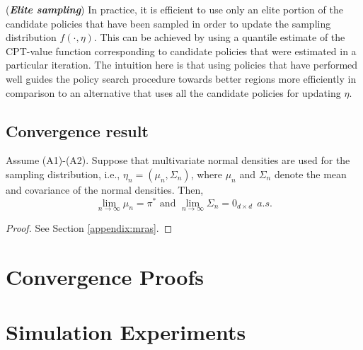 \documentclass[11pt,letterpaper,english]{article}
\begin{document}
\begin{remark}(\textbf{\textit{Elite sampling}})
In practice, it is efficient to use only an elite portion of the candidate policies that have been sampled in order to update the sampling distribution $f(\cdot,\eta)$. This can be achieved by using a quantile estimate of the CPT-value function corresponding to candidate policies that were estimated in a particular iteration. The intuition here is that using policies that have performed well guides the policy search procedure towards better regions more efficiently in comparison to an alternative that uses all the candidate policies for updating $\eta$.
\end{remark}

\subsection{Convergence result}
\begin{theorem}\label{thm:mras}
Assume (A1)-(A2). Suppose that multivariate normal densities are used for the sampling distribution, i.e., $\eta_n = (\mu_n, \Sigma_n)$, where $\mu_n$ and $\Sigma_n$ denote the mean and covariance of the normal densities.
Then, 
\begin{equation}\label{eqn:smain}
\lim_{n\rightarrow \infty}\mu_n=\pi^* \text{ and } \lim_{n\rightarrow \infty}\Sigma_n=0_{d\times d}~~a.s.
\end{equation}
\end{theorem}
\begin{proof}
 See Section \ref{appendix:mras}.
\end{proof}


\section{Convergence Proofs}
\label{sec:convergence}

\section{Simulation Experiments}
\label{sec:expts}
\end{document}
